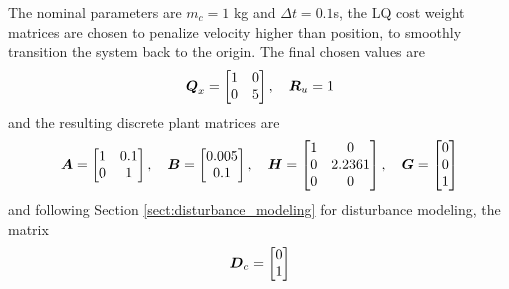 The nominal parameters are $m_{c} = 1$ kg and $\Delta t = 0.1$s, the LQ cost weight matrices are chosen to penalize velocity higher than position, to smoothly transition the system back to the origin.  The final chosen values are
\begin{equation*}
\begin{aligned}
    \vb*{Q}_{x} = \begin{bmatrix} 1 & 0 \\ 0 & 5\end{bmatrix}, \hspace{10pt}
    \vb*{R}_{u} = 1
\end{aligned}
\end{equation*}
and the resulting discrete plant matrices are
\begin{equation*}
\begin{aligned}
    \vb*{A} = \begin{bmatrix}
        1 & 0.1\\
        0 & 1\\
    \end{bmatrix},\hspace{10pt}
    \vb*{B} = \begin{bmatrix}
        0.005\\
        0.1\\
    \end{bmatrix},\hspace{10pt}
    \vb*{H} = \begin{bmatrix}
        1 & 0\\
        0 & 2.2361\\
        0 & 0\\
    \end{bmatrix},\hspace{10pt}
    \vb*{G} = \begin{bmatrix}
        0\\
        0\\
        1\\
    \end{bmatrix}
\end{aligned}
\end{equation*}
and following Section \ref{sect:disturbance_modeling} for disturbance modeling, the matrix
\begin{equation*}
\begin{aligned}
    \vb*{D}_{c} = \begin{bmatrix}
        0\\
        1\\
    \end{bmatrix}
\end{aligned}
\end{equation*}
